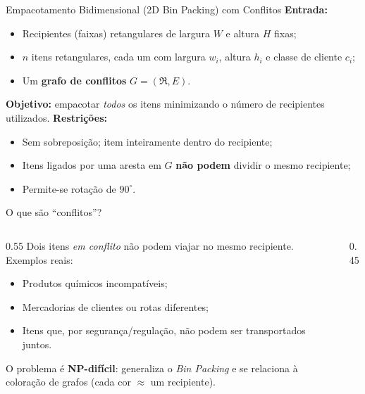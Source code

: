 \documentclass[aspectratio=169]{beamer}
\begin{document}
\begin{frame}{Empacotamento Bidimensional (2D Bin Packing) com Conflitos}
  \textbf{Entrada:}
  \begin{itemize}
    \item Recipientes (faixas) retangulares de largura $W$ e altura $H$ fixas;
    \item $n$ itens retangulares, cada um com largura $w_i$, altura $h_i$ e
          classe de cliente $c_i$;
    \item Um \textbf{grafo de conflitos} $G=(\Re, E)$.
  \end{itemize}
  \vspace{0.4em}
  \textbf{Objetivo:} empacotar \emph{todos} os itens minimizando o número de
  recipientes utilizados.
  \vspace{0.4em}
  \textbf{Restrições:}
  \begin{itemize}
    \item Sem sobreposição; item inteiramente dentro do recipiente;
    \item Itens ligados por uma aresta em $G$ \textbf{não podem} dividir o mesmo
          recipiente;
    \item Permite-se rotação de $90^\circ$.
  \end{itemize}
\end{frame}

\begin{frame}{O que são ``conflitos''?}
  \begin{columns}
    \begin{column}{0.55\textwidth}
      Dois itens \emph{em conflito} não podem viajar no mesmo recipiente.
      Exemplos reais:
      \begin{itemize}
        \item Produtos químicos incompatíveis;
        \item Mercadorias de clientes ou rotas diferentes;
        \item Itens que, por segurança/regulação, não podem ser transportados
              juntos.
      \end{itemize}
      \vspace{0.5em}
      O problema é \textbf{NP-difícil}: generaliza o \textit{Bin Packing} e se
      relaciona à coloração de grafos (cada cor $\approx$ um recipiente).
    \end{column}
    \begin{column}{0.45\textwidth}
      \centering
    \end{column}
  \end{columns}
\end{frame}
\end{document}
